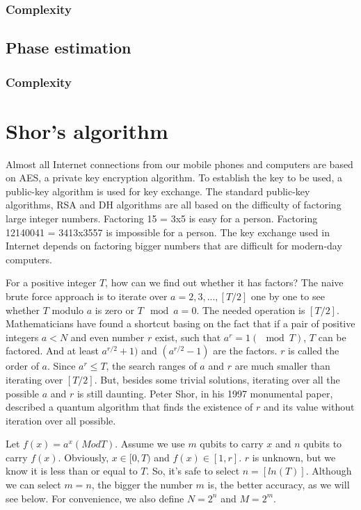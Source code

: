 \documentclass{ctexbook}
\begin{document}
\subsubsection{Complexity}

\subsection{Phase estimation}
\subsubsection{Complexity}

\section{Shor's algorithm}
Almost all Internet connections from our mobile phones and computers are based on AES, a private key encryption algorithm. To establish the key to be used, a public-key algorithm is used for key exchange. The standard public-key algorithms, RSA and DH algorithms are all based on the difficulty of factoring large integer numbers. Factoring 15 = 3x5 is easy for a person. Factoring 12140041 = 3413x3557 is impossible for a person. The key exchange used in Internet depends on factoring bigger numbers that are difficult for modern-day computers.

For a positive integer $T$, how can we find out whether it has factors? The naive brute force approach is to iterate over $a=2, 3, ..., [T/2]$ one by one to see whether $T$ modulo $a$ is zero or $T \mod a = 0$. The needed operation is $[T/2]$. Mathematicians have found a shortcut basing on the fact that if a pair of positive integers $a < N$ and even number $r$ exist, such that $a^r = 1(\mod T)$, $T$ can be factored. And at least $a^{r/2}+1)$ and $(a^{r/2}-1)$ are the factors. $r$ is called the order of $a$. Since $a^r \leq T$, the search ranges of $a$ and $r$ are much smaller than iterating over $[T/2]$. But, besides some trivial solutions, iterating over all the possible $a$ and $r$ is still daunting. Peter Shor, in his 1997 monumental paper\cite{1997Shor}, described a quantum algorithm that finds the existence of $r$ and its value without iteration over all possible.

Let $f(x) = a^x (Mod T)$. Assume we use $m$ qubits to carry $x$ and $n$ qubits to carry $f(x)$. Obviously, $x\in [0, T)$ and $f(x) \in [1,r]$. $r$ is unknown, but we know it is less than or equal to $T$. So, it's safe to select $n = [ln(T)]$. Although we can select $m=n$, the bigger the number $m$ is, the better accuracy, as we will see below. For convenience, we also define $N=2^n$ and $M=2^m$.
\end{document}
